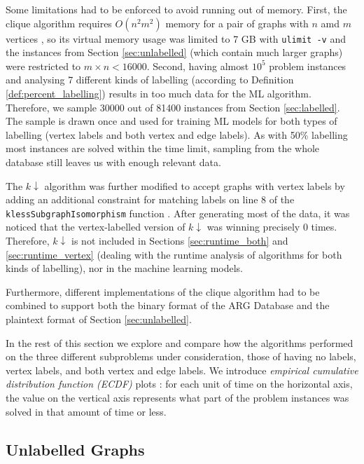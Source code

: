 \documentclass{l4proj}
\theoremstyle{definition}
\theoremstyle{remark}
\begin{document}
Some limitations had to be enforced to avoid running out of memory. First, the
clique algorithm requires $O(n^2m^2)$ memory for a pair of graphs with $n$ amd
$m$ vertices \cite{DBLP:conf/aaai/HoffmannMR17, DBLP:conf/cp/McCreeshNPS16}, so
its virtual memory usage was limited to 7 GB with \texttt{ulimit -v} and the
instances from Section \ref{sec:unlabelled} (which contain much larger graphs)
were restricted to $m \times n < \num{16000}$. Second, having almost $10^5$
problem instances and analysing 7 different kinds of labelling (according to
Definition \ref{def:percent_labelling}) results in too much data for the ML
algorithm. Therefore, we sample \num{30000} out of \num{81400} instances from
Section \ref{sec:labelled}. The sample is drawn once and used for training ML
models for both types of labelling (vertex labels and both vertex and edge
labels). As with 50\% labelling most instances are solved within the time limit,
sampling from the whole database still leaves us with enough relevant data.

The $k\downarrow$ algorithm was further modified to accept graphs with vertex
labels by adding an additional constraint for matching labels on line 8 of the
\texttt{klessSubgraphIsomorphism} function \cite{DBLP:conf/aaai/HoffmannMR17}.
After generating most of the data, it was noticed that the vertex-labelled
version of $k\downarrow$ was winning precisely 0 times. Therefore, $k\downarrow$
is not included in Sections \ref{sec:runtime_both} and \ref{sec:runtime_vertex}
(dealing with the runtime analysis of algorithms for both kinds of labelling),
nor in the machine learning models.

Furthermore, different implementations of the clique algorithm had to be
combined to support both the binary format of the ARG Database and the plaintext
format of Section \ref{sec:unlabelled}.

In the rest of this section we explore and compare how the algorithms performed
on the three different subproblems under consideration, those of having no
labels, vertex labels, and both vertex and edge labels. We introduce
\emph{empirical cumulative distribution function (ECDF)}
plots \cite{10.2307/2334448}: for each unit of time on the horizontal axis, the
value on the vertical axis represents what part of the problem instances was
solved in that amount of time or less.

\subsection{Unlabelled Graphs}
\end{document}
